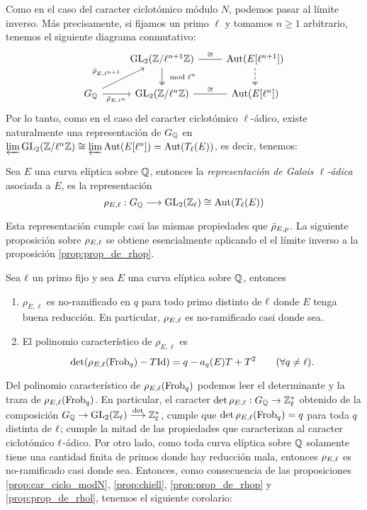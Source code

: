 \documentclass[../../tesis_maestria]{subfiles}
\begin{document}
Como en el caso del caracter ciclot\'omico m\'odulo $N$, podemos pasar al l\'imite inverso. M\'as precisamente, si fijamos un primo $\ell$ y tomamos $n\geq1$ arbitrario, tenemos el siguiente diagrama conmutativo:
\[
  \begin{tikzcd}
    &
    \GL_2(\ZZ/\ell^{n+1}\ZZ) \arrow[d,two heads,"\mod \ell^n"]
    \arrow[r,dash,"\cong"]&
    \text{Aut}(E[\ell^{n+1}]) \arrow[d,two heads,dashed]\\
    \GQ \arrow[ru,"\bar{\rho}_{E,\ell^{n+1}}"] \arrow[r,"\bar{\rho}_{E,\ell^n}"']&
    \GL_2(\ZZ/\ell^n\ZZ) \arrow[r,dash,"\cong"]&
    \text{Aut}(E[\ell^n])
  \end{tikzcd}
\]
Por lo tanto, como en el caso del caracter ciclot\'omico $\ell$-\'adico, existe naturalmente una representaci\'on de $G_{\mathbb{Q}}$ en $\varprojlim\mathrm{GL}_2(\mathbb{Z}/\ell^n\mathbb{Z})\cong\varprojlim\text{Aut}(E[\ell^n])=\text{Aut}(T_{\ell}(E))$, es decir, tenemos:

\begin{defin}
  Sea $E$ una curva el\'iptica sobre $\mathbb{Q}$, entonces la \emph{representaci\'on de Galois
    $\ell$-\'adica} asociada a $E$, es la representaci\'on
  \[
    \rho_{E,\ell}:G_{\mathbb{Q}}\longrightarrow\mathrm{GL}_2(\mathbb{Z}_{\ell})\cong\text{Aut}(T_{\ell}(E))
  \]
\end{defin}

Esta representaci\'on cumple casi las mismas propiedades que $\bar{\rho}_{E,p}$. La siguiente proposici\'on sobre $\rho_{E,\ell}$ se obtiene esencialmente aplicando el el l\'imite inverso a la proposici\'on \ref{prop:prop_de_rhop}.

\begin{prop}\label{prop:prop_de_rhol}
  Sea $\ell$ un primo fijo y sea $E$ una curva el\'iptica sobre $\mathbb{Q}$, entonces
  \begin{enumerate}[label=\roman*)]
  \item $\rho_{E,\ell}$ es no-ramificado en $q$ para todo primo distinto de $\ell$ donde $E$ tenga buena reducci\'on. En particular, $\rho_{E,\ell}$ es no-ramificado casi donde sea.
  \item El polinomio caracter\'istico de $\rho_{E,\ell}$ es
    \[
      \det(\rho_{E,\ell}(\mathrm{Frob}_q)-T\mathrm{Id})=q-a_q(E)T+T^2 \qquad(\forall q\neq \ell).
    \]
  \end{enumerate}
\end{prop}

Del polinomio caracter\'istico de $\rho_{E,\ell}(\mathrm{Frob}_q)$ podemos leer el determinante y la traza de $\rho_{E,\ell}(\mathrm{Frob}_q)$. En particular, el caracter $\det\rho_{E,\ell}:G_{\mathbb{Q}}\rightarrow\mathbb{Z}^*_{\ell}$ obtenido de la composici\'on $G_{\mathbb{Q}}\rightarrow\mathrm{GL}_2(\mathbb{Z}_{\ell})\overset{\det}{\longrightarrow}\mathbb{Z}^*_{\ell}$, cumple que $\det\rho_{E,\ell}(\mathrm{Frob}_q)=q$ para toda $q$ distinta de $\ell$; cumple la mitad de las propiedades que caracterizan al caracter ciclot\'omico $\ell$-\'adico. Por otro lado, como toda curva el\'iptica
sobre $\mathbb{Q}$ solamente tiene una cantidad finita de primos donde hay reducci\'on mala, entonces $\rho_{E,\ell}$ es no-ramificado casi donde sea. Entonces, como consecuencia de las proposiciones \ref{prop:car_ciclo_modN}, \ref{prop:chiell}, \ref{prop:prop_de_rhop}  y \ref{prop:prop_de_rhol}, tenemos el siguiente corolario:
\end{document}
